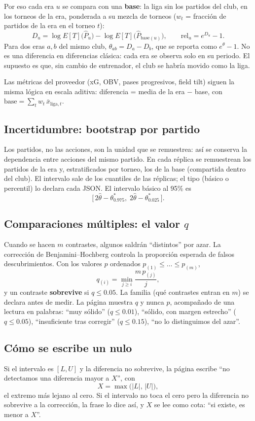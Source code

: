 \documentclass[11pt,a4paper]{article}
\begin{document}
Por eso cada era $u$ se compara con una \textbf{base}: la liga sin los partidos
del club, en los torneos de la era, ponderada a su mezcla de torneos
($w_t$ = fracción de partidos de la era en el torneo $t$):
\[
D_u = \log E[T]\big(\hat P_u\big) - \log E[T]\big(\hat P_{\text{base}(u)}\big),
\qquad \text{rel}_u = e^{D_u} - 1 .
\]
Para dos eras $a,b$ del mismo club, $\theta_{ab} = D_a - D_b$, que se reporta
como $e^{\theta}-1$. No es una diferencia en diferencias clásica: cada era se
observa solo en su periodo. El supuesto es que, sin cambio de entrenador, el
club se habría movido como la liga.

Las métricas del proveedor (xG, OBV, pases progresivos, field tilt) siguen la
misma lógica en escala aditiva: diferencia = media de la era $-$ base, con
$\text{base} = \sum_t w_t\,\bar x_{\text{liga},t}$.

\subsection{Incertidumbre: bootstrap por partido}
Los partidos, no las acciones, son la unidad que se remuestrea: así se conserva
la dependencia entre acciones del mismo partido. En cada réplica se remuestrean
los partidos de la era y, estratificados por torneo, los de la base (compartida
dentro del club). El intervalo sale de los cuantiles de las réplicas; el tipo
(básico o percentil) lo declara cada JSON. El intervalo básico al 95\% es
\[
\big[\,2\hat\theta - \theta^*_{0.975},\; 2\hat\theta - \theta^*_{0.025}\,\big].
\]

\subsection{Comparaciones múltiples: el valor $q$}
Cuando se hacen $m$ contrastes, algunos saldrán ``distintos'' por azar. La
corrección de Benjamini--Hochberg controla la proporción esperada de falsos
descubrimientos. Con los valores $p$ ordenados $p_{(1)}\le\dots\le p_{(m)}$,
\[
q_{(i)} = \min_{j \ge i} \frac{m\,p_{(j)}}{j},
\]
y un contraste \textbf{sobrevive} si $q \le 0.05$. La familia (qué contrastes
entran en $m$) se declara antes de medir. La página muestra $q$ y nunca $p$,
acompañado de una lectura en palabras: ``muy sólido'' ($q\le 0.01$), ``sólido,
con margen estrecho'' ($q\le 0.05$), ``insuficiente tras corregir''
($q\le 0.15$), ``no lo distinguimos del azar''.

\subsection{Cómo se escribe un nulo}\label{sec:nulos}
Si el intervalo es $[L,U]$ y la diferencia no sobrevive, la página escribe
``no detectamos una diferencia mayor a $X$'', con
\[
X = \max\big(|L|,\,|U|\big),
\]
el extremo más lejano al cero. Si el intervalo no toca el cero pero la
diferencia no sobrevive a la corrección, la frase lo dice así, y $X$ se lee
como cota: ``si existe, es menor a $X$''.
\end{document}
